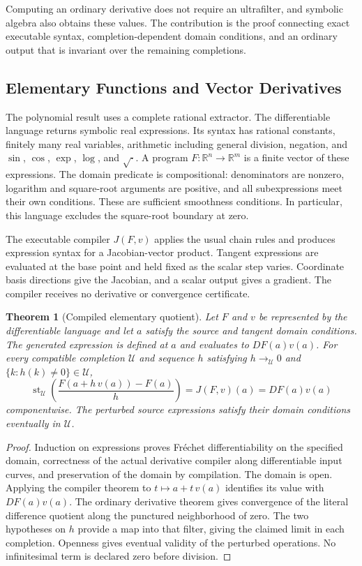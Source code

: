 \documentclass[11pt,a4paper]{article}
\theoremstyle{result}
\newtheorem{theorem}{Theorem}
\theoremstyle{definition}
\newcommand{\R}{\mathbb{R}}
\newcommand{\PUF}{\mathcal{U}}
\newcommand{\st}{\operatorname{st}}
\begin{document}
Computing an ordinary derivative does not require an ultrafilter, and symbolic algebra also obtains these values. The contribution is the proof connecting exact executable syntax, completion-dependent domain conditions, and an ordinary output that is invariant over the remaining completions.

\subsection{Elementary Functions and Vector Derivatives}\label{sec:differentiable}

The polynomial result uses a complete rational extractor. The differentiable language returns symbolic real expressions. Its syntax has rational constants, finitely many real variables, arithmetic including general division, negation, and $\sin$, $\cos$, $\exp$, $\log$, and $\sqrt{\mathord\cdot}$. A program $F:\R^n\to\R^m$ is a finite vector of these expressions. The domain predicate is compositional: denominators are nonzero, logarithm and square-root arguments are positive, and all subexpressions meet their own conditions. These are sufficient smoothness conditions. In particular, this language excludes the square-root boundary at zero.

The executable compiler $J(F,v)$ applies the usual chain rules and produces expression syntax for a Jacobian-vector product. Tangent expressions are evaluated at the base point and held fixed as the scalar step varies. Coordinate basis directions give the Jacobian, and a scalar output gives a gradient. The compiler receives no derivative or convergence certificate.

\begin{theorem}[Compiled elementary quotient]\label{thm:elementary-quotient}
  Let $F$ and $v$ be represented by the differentiable language and let $a$ satisfy the source and tangent domain conditions. The generated expression is defined at $a$ and evaluates to $DF(a)v(a)$. For every compatible completion $\PUF$ and sequence $h$ satisfying $h\to_{\PUF}0$ and $\{k:h(k)\ne0\}\in\PUF$,
  \[
    \st_{\PUF}\!\left(\frac{F(a+h\,v(a))-F(a)}{h}\right)
    = J(F,v)(a)=DF(a)v(a)
  \]
  componentwise. The perturbed source expressions satisfy their domain conditions eventually in $\PUF$.
\end{theorem}

\begin{proof}
  Induction on expressions proves Fr\'echet differentiability on the specified domain, correctness of the actual derivative compiler along differentiable input curves, and preservation of the domain by compilation. The domain is open. Applying the compiler theorem to $t\mapsto a+t\,v(a)$ identifies its value with $DF(a)v(a)$. The ordinary derivative theorem gives convergence of the literal difference quotient along the punctured neighborhood of zero. The two hypotheses on $h$ provide a map into that filter, giving the claimed limit in each completion. Openness gives eventual validity of the perturbed operations. No infinitesimal term is declared zero before division.
\end{proof}
\end{document}
